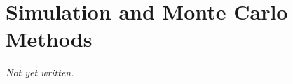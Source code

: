 \chapter{Simulation and Monte Carlo Methods}\label{ch:simulation-monte-carlo}


\textit{Not yet written.}
